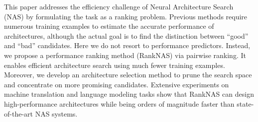 This paper addresses the efficiency challenge of Neural Architecture Search (NAS) by formulating the task as a ranking problem. Previous methods require numerous training examples to estimate the accurate performance of architectures, although the actual goal is to find the distinction between ``good'' and ``bad'' candidates. Here we do not resort to performance predictors. Instead, we propose a performance ranking method (RankNAS) via pairwise ranking. It enables efficient architecture search using much fewer training examples. Moreover, we develop an architecture selection method to prune the search space and concentrate on more promising candidates. Extensive experiments on machine translation and language modeling tasks show that RankNAS can design high-performance architectures while being orders of magnitude faster than state-of-the-art NAS systems.
